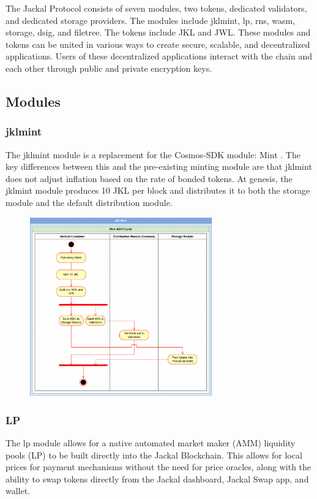 \documentclass[a4paper]{article}
\begin{document}
The Jackal Protocol consists of seven modules, two tokens, dedicated validators, and dedicated storage providers. The modules include jklmint, lp, rns, wasm, storage, dsig, and filetree. The tokens include JKL and JWL.  These modules and tokens can be united in various ways to create secure, scalable, and decentralized applications. Users of these decentralized applications interact with the chain and each other through public and private encryption keys.

\newpage
\subsection{Modules}
\subsubsection{jklmint}
The jklmint module is a replacement for the Cosmos-SDK module: Mint \cite{mint}. The key differences between this and the pre-existing minting module are that jklmint does not adjust inflation based on the rate of bonded tokens. At genesis, the jklmint module produces 10 JKL per block and distributes it to both the storage module and the default distribution module.

\begin{figure}[!htbp]
\centering
\includegraphics[width=0.7\textwidth]{assets/mint.png}
\caption{}
\end{figure}

\newpage

\subsubsection{LP}
The lp module allows for a native automated market maker (AMM) liquidity pools (LP) to be built directly into the Jackal Blockchain. This allows for local prices for payment mechanisms without the need for price oracles, along with the ability to swap tokens directly from the Jackal dashboard, Jackal Swap app, and wallet. 
\end{document}
